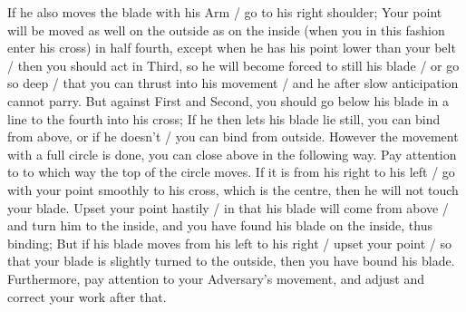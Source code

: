 If he also moves the blade with his Arm / go to his right shoulder;
Your point will be moved as well on the outside as on the inside (when
you in this fashion enter his cross) in half fourth, except when he
has his point lower than your belt / then you should act in Third, so
he will become forced to still his blade / or go so deep / that you
can thrust into his movement / and he after slow anticipation cannot parry.
But against First and Second, you should go below his blade in a line
to the fourth into his cross; If he then lets his blade lie still, you
can bind from above, or if he doesn't / you can bind from
outside. However the movement with a full circle is done, you can
close above in the following way. 
Pay attention to to which way the top of the circle moves. If it is
from his right to his left / go with your point smoothly to his cross,
which is the centre, then he will not touch your blade. Upset your
point hastily / in that his blade will come from above / and turn him
to the inside, and you have found his blade on the inside, thus
binding; But if his blade moves from his left to his right / upset
your point / so that your blade is slightly turned to the outside,
then you have bound his blade. Furthermore, pay attention to your
Adversary's movement, and adjust and correct your work after that.

